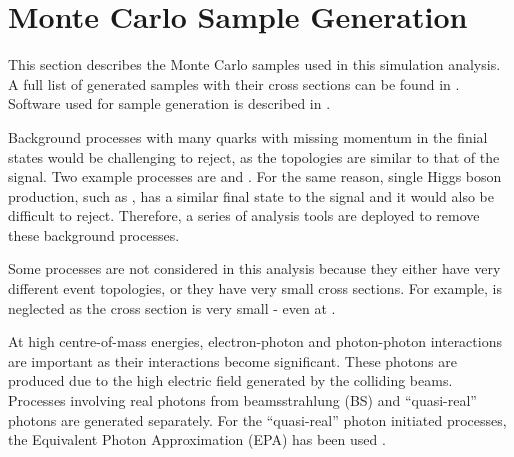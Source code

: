 



\section{Monte Carlo Sample Generation}


This section describes the Monte Carlo samples used in this simulation analysis. A full list of generated samples with their cross sections can be found in . Software used for sample generation is described in .



Background processes with many quarks with missing momentum in the finial states would be challenging to reject, as the topologies are similar to that of the signal. Two example processes are \eeTo{ \Pquark \Pquark \Pquark \Pquark \Pnu \APnu} and \HepProcess{\Pepm\Pphoton \to \Pnu \Pquark \Pquark \Pquark \Pquark}. For the same reason, single Higgs boson production, such as \eeTo{\Pquark \Pquark \PHiggs \Pnu \APnu}, has a similar final state to the signal and it would also be difficult to reject. Therefore, a series of analysis tools are deployed to remove these background processes.

Some processes are not considered in this analysis because they either have very different event topologies, or they have very small cross sections. For example,  \HepProcess{\Egamma   \to \Pquark \Pquark \PHiggs \Plepton} is neglected  as the cross section is very small - even at .

At high centre-of-mass energies, electron-photon and photon-photon interactions are important as their interactions become significant. These photons are produced due to the high electric field generated by the colliding beams. Processes involving real photons from beamsstrahlung (BS) and ``quasi-real'' photons are generated separately. For the ``quasi-real'' photon initiated processes, the Equivalent Photon Approximation (EPA) has been used \cite{lyth:jpa00215525}.

